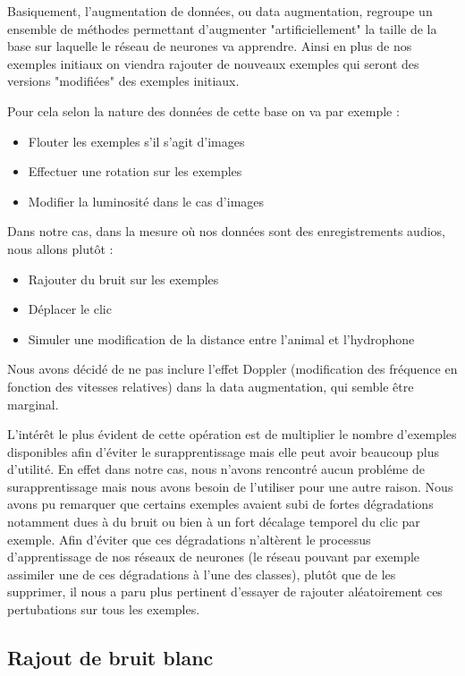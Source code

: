 Basiquement, l'augmentation de données, ou data augmentation, regroupe un ensemble de méthodes permettant d'augmenter "artificiellement" la taille de la base sur laquelle le réseau de neurones va apprendre. Ainsi en plus de nos exemples initiaux on viendra rajouter de nouveaux exemples qui seront des versions "modifiées" des exemples initiaux.

Pour cela selon la nature des données de cette base on va par exemple :
\begin{itemize}
\item Flouter les exemples s'il s'agit d'images
\item Effectuer une rotation sur les exemples
\item Modifier la luminosité dans le cas d'images
\end{itemize}

Dans notre cas, dans la mesure où nos données sont des enregistrements audios, nous allons plutôt :
\begin{itemize}
\item Rajouter du bruit sur les exemples
\item Déplacer le clic
\item Simuler une modification de la distance entre l'animal et l'hydrophone
\end{itemize}

Nous avons décidé de ne pas inclure l'effet Doppler (modification des fréquence en fonction des vitesses relatives) dans la data augmentation, qui semble être
marginal.

L'intérêt le plus évident de cette opération est de multiplier le nombre d'exemples disponibles afin d'éviter le surapprentissage mais elle peut avoir beaucoup plus d'utilité.
En effet dans notre cas, nous n'avons rencontré aucun probléme de surapprentissage mais nous avons besoin de l'utiliser pour une autre raison.
Nous avons pu remarquer que certains exemples avaient subi de fortes dégradations notamment dues
à du bruit ou bien à un fort décalage temporel du clic par exemple.
Afin d'éviter que ces dégradations n'altèrent le processus d'apprentissage de nos réseaux de neurones (le réseau pouvant par exemple assimiler une de ces dégradations à l'une des classes),
plutôt que de les supprimer, il nous a paru plus pertinent d'essayer de rajouter aléatoirement ces
pertubations sur tous les exemples.


\hypertarget{Rajout-de-bruit-blanc}{%
\subsection{Rajout de bruit blanc}
\label{Rajout-de-bruit-blanc}}

